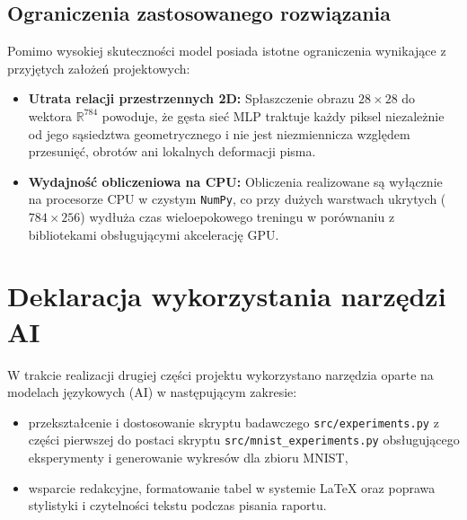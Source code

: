 \documentclass{article}
\begin{document}
\subsection{Ograniczenia zastosowanego rozwiązania}
Pomimo wysokiej skuteczności model posiada istotne ograniczenia wynikające z przyjętych założeń projektowych:
\begin{itemize}
    \item \textbf{Utrata relacji przestrzennych 2D:} Spłaszczenie obrazu $28 \times 28$ do wektora $\mathbb{R}^{784}$ powoduje, że gęsta sieć MLP traktuje każdy piksel niezależnie od jego sąsiedztwa geometrycznego i nie jest niezmiennicza względem przesunięć, obrotów ani lokalnych deformacji pisma.
    \item \textbf{Wydajność obliczeniowa na CPU:} Obliczenia realizowane są wyłącznie na procesorze CPU w czystym \texttt{NumPy}, co przy dużych warstwach ukrytych ($784 \times 256$) wydłuża czas wieloepokowego treningu w porównaniu z bibliotekami obsługującymi akcelerację GPU.
\end{itemize}

\section{Deklaracja wykorzystania narzędzi AI}

W trakcie realizacji drugiej części projektu wykorzystano narzędzia oparte na modelach językowych (AI) w następującym zakresie:
\begin{itemize}
    \item przekształcenie i dostosowanie skryptu badawczego \texttt{src/experiments.py} z części pierwszej do postaci skryptu \texttt{src/mnist\_experiments.py} obsługującego eksperymenty i generowanie wykresów dla zbioru MNIST,
    \item wsparcie redakcyjne, formatowanie tabel w systemie \LaTeX{} oraz poprawa stylistyki i czytelności tekstu podczas pisania raportu.
\end{itemize}
\end{document}
